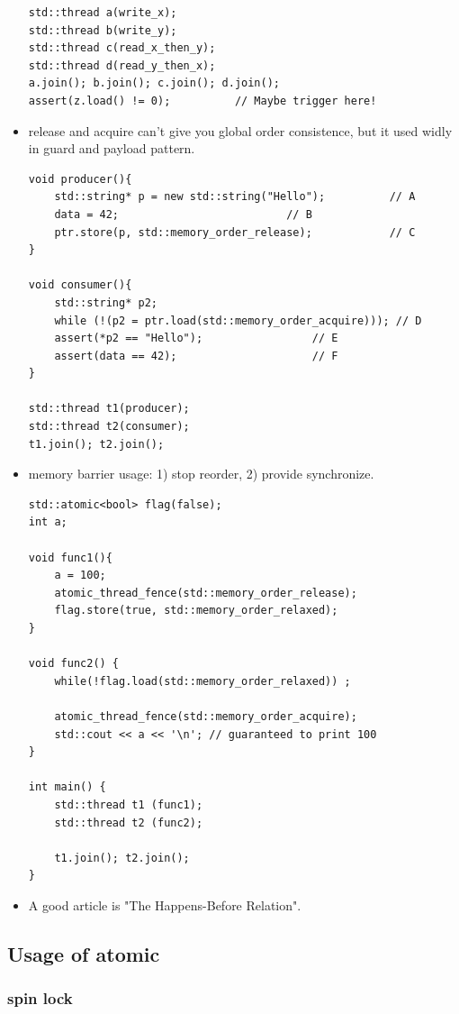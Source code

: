 \documentclass[a4paper,11pt,twoside]{book}
\begin{document}
\begin{itemize}
\begin{lstlisting}
std::thread a(write_x);
std::thread b(write_y);
std::thread c(read_x_then_y);
std::thread d(read_y_then_x);
a.join(); b.join(); c.join(); d.join();
assert(z.load() != 0);			// Maybe trigger here!
\end{lstlisting}

\item release and acquire can't give you global order consistence, but it used widly in guard and payload pattern.

\begin{lstlisting}
void producer(){
    std::string* p = new std::string("Hello");			// A
    data = 42;							// B
    ptr.store(p, std::memory_order_release);			// C
}
 
void consumer(){
    std::string* p2;
    while (!(p2 = ptr.load(std::memory_order_acquire))); // D
    assert(*p2 == "Hello");					// E
    assert(data == 42);						// F
}
 
std::thread t1(producer);
std::thread t2(consumer);
t1.join(); t2.join();
\end{lstlisting}
\item memory barrier usage: 1) stop reorder, 2) provide synchronize.
\begin{lstlisting}
std::atomic<bool> flag(false);
int a;

void func1(){
    a = 100;
    atomic_thread_fence(std::memory_order_release);
    flag.store(true, std::memory_order_relaxed);
}

void func2() {
    while(!flag.load(std::memory_order_relaxed)) ;

    atomic_thread_fence(std::memory_order_acquire);
    std::cout << a << '\n'; // guaranteed to print 100
}

int main() {
    std::thread t1 (func1);
    std::thread t2 (func2);

    t1.join(); t2.join();
}
\end{lstlisting}
	
		\item A good article is "The Happens-Before Relation".
\end{itemize}

\subsection{Usage of atomic}

\subsubsection{spin lock}
\end{document}
